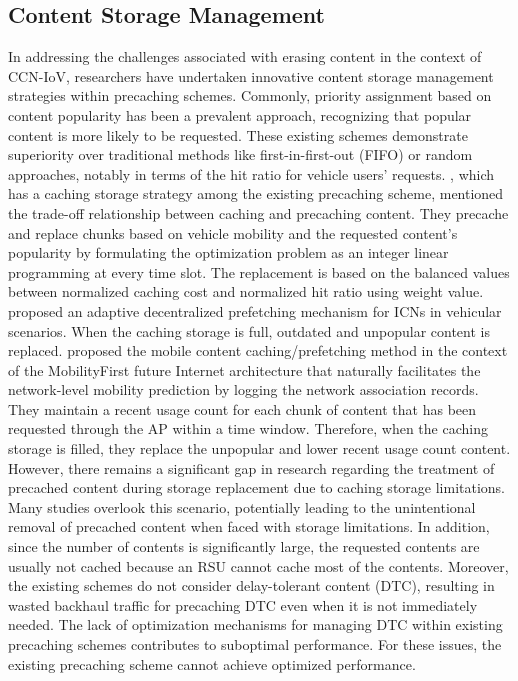 \documentclass[journal]{IEEEtran}
\begin{document}
\subsection{Content Storage Management}
In addressing the challenges associated with erasing content in the context of CCN-IoV, researchers have undertaken innovative content storage management strategies within precaching schemes.
Commonly, priority assignment based on content popularity has been a prevalent approach, recognizing that popular content is more likely to be requested.
These existing schemes demonstrate superiority over traditional methods like first-in-first-out (FIFO) or random approaches, notably in terms of the hit ratio for vehicle users' requests.
\cite{Liu2018}, which has a caching storage strategy among the existing precaching scheme, mentioned the trade-off relationship between caching and precaching content.
They precache and replace chunks based on vehicle mobility and the requested content's popularity by formulating the optimization problem as an integer linear programming at every time slot.
The replacement is based on the balanced values between normalized caching cost and normalized hit ratio using weight value.
\cite{Grewe2018} proposed an adaptive decentralized prefetching mechanism for ICNs in vehicular scenarios.
When the caching storage is full, outdated and unpopular content is replaced.
\cite{Zhang2015} proposed the mobile content caching/prefetching method in the context of the MobilityFirst future Internet architecture that naturally facilitates the network-level mobility prediction by logging the network association records.
They maintain a recent usage count for each chunk of content that has been requested through the AP within a time window.
Therefore, when the caching storage is filled, they replace the unpopular and lower recent usage count content.
However, there remains a significant gap in research regarding the treatment of precached content during storage replacement due to caching storage limitations.
Many studies overlook this scenario, potentially leading to the unintentional removal of precached content when faced with storage limitations.
In addition, since the number of contents is significantly large, the requested contents are usually not cached because an RSU cannot cache most of the contents.
Moreover, the existing schemes do not consider delay-tolerant content (DTC), resulting in wasted backhaul traffic for precaching DTC even when it is not immediately needed.
The lack of optimization mechanisms for managing DTC within existing precaching schemes contributes to suboptimal performance.
For these issues, the existing precaching scheme cannot achieve optimized performance.
\end{document}
